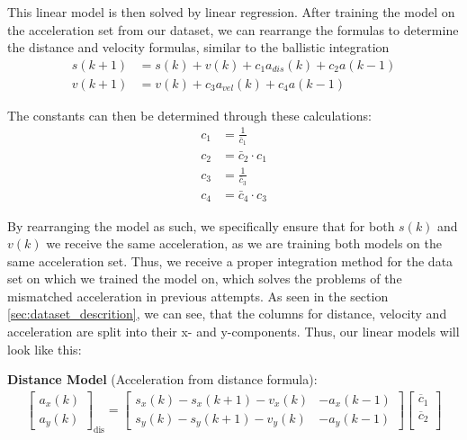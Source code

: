 This linear model is then solved by linear regression. 
After training the model on the acceleration set from our dataset, we can rearrange the formulas
to determine the distance and velocity formulas, similar to the ballistic integration
\begin{align} 
    s(k+1) &= s(k) + v(k) + c_1 a_{dis}(k) + c_2 a(k-1) \\
    v(k+1) &= v(k)        + c_3 a_{vel}(k) + c_4 a(k-1)
\end{align}


The constants can then be determined through these calculations:
\begin{align}
   c_1 &= \frac{1}{\bar{c}_1} \\
   c_2 &= \bar{c}_2 \cdot c_1 \\
   c_3 &= \frac{1}{\bar{c}_3} \\
   c_4 &= \bar{c}_4 \cdot c_3
\end{align}

By rearranging the model as such, we specifically ensure that for both $s(k)$ and $v(k)$ we receive the same 
acceleration, as we are training both models on the same acceleration set.
Thus, we receive a proper integration method for the data set on which we trained the model on, which solves the 
problems of the mismatched acceleration in previous attempts.
As seen in the section \ref{sec:dataset_descrition}, we can see, that the columns for distance, velocity and acceleration are 
split into their x- and y-components.
Thus, our linear models will look like this:

\hfil

\textbf{Distance Model} (Acceleration from distance formula):
{\footnotesize
\begin{align} \label{eq:lin_model_acc_dis}
    \begin{bmatrix}
        a_x(k) \\ 
        a_y(k)       
    \end{bmatrix}_{\text{dis}}
    =
    \begin{bmatrix}
       s_x(k) - s_x(k+1) - v_x(k) & -a_x(k-1) \\ 
       s_y(k) - s_y(k+1) - v_y(k) & -a_y(k-1)   
    \end{bmatrix}
    \begin{bmatrix}
        \overline{c}_1 \\
        \overline{c}_2 \\
   \end{bmatrix}
\end{align}
}

